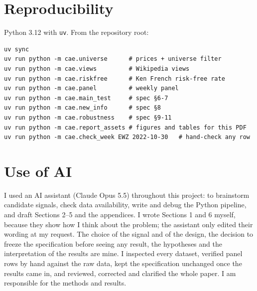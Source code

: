 \documentclass[11pt,a4paper]{article}
\begin{document}
\FloatBarrier
\section{Reproducibility}
Python 3.12 with \texttt{uv}. From the repository root:
\begin{verbatim}
uv sync
uv run python -m cae.universe      # prices + universe filter
uv run python -m cae.views         # Wikipedia views
uv run python -m cae.riskfree      # Ken French risk-free rate
uv run python -m cae.panel         # weekly panel
uv run python -m cae.main_test     # spec §6-7
uv run python -m cae.new_info      # spec §8
uv run python -m cae.robustness    # spec §9-11
uv run python -m cae.report_assets # figures and tables for this PDF
uv run python -m cae.check_week EWZ 2022-10-30   # hand-check any row
\end{verbatim}

\section{Use of AI}
I used an AI assistant (Claude Opus 5.5) throughout this project: to brainstorm candidate
signals, check data availability, write and debug the Python pipeline, and draft Sections 2--5
and the appendices. I wrote Sections 1 and 6 myself, because they show how I think about the
problem; the assistant only edited their wording at my request. The choice of the signal and of the
design, the decision to freeze the specification before seeing any result, the hypotheses and the
interpretation of the results are mine. I inspected every dataset, verified panel rows by hand
against the raw data, kept the specification unchanged once the results came in, and reviewed,
corrected and clarified the whole paper. I am responsible for the methods and results.

\FloatBarrier
\end{document}
